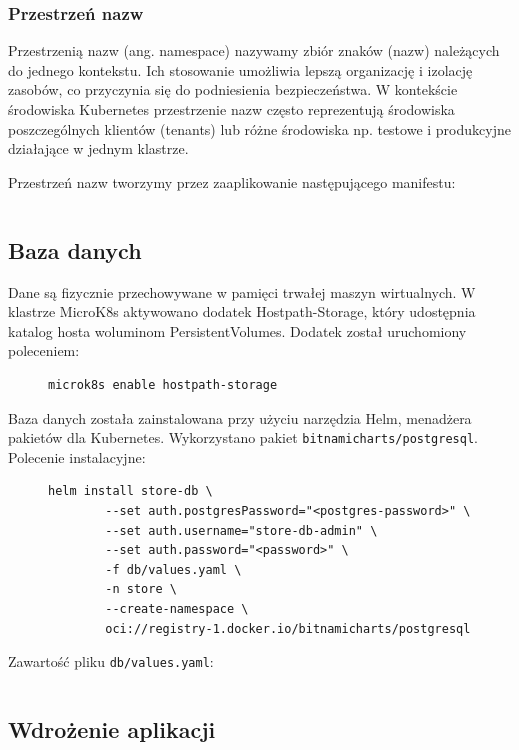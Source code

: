 \subsubsection{Przestrzeń nazw}

Przestrzenią nazw (ang. namespace) nazywamy zbiór znaków (nazw) należących do jednego kontekstu.
Ich stosowanie umożliwia lepszą organizację i izolację zasobów, co przyczynia się do podniesienia bezpieczeństwa.
W kontekście środowiska Kubernetes przestrzenie nazw często reprezentują środowiska poszczególnych klientów (tenants) lub różne środowiska np. testowe i produkcyjne działające w jednym klastrze.

Przestrzeń nazw tworzymy przez zaaplikowanie następującego manifestu:
\begin{figure}[H]
    \inputminted{yaml}{code/store-namespace.yaml}
    \label{fig:store-namespace}
\end{figure}

\subsection{Baza danych}

Dane są fizycznie przechowywane w pamięci trwałej maszyn wirtualnych.
W klastrze MicroK8s aktywowano dodatek Hostpath-Storage, który udostępnia katalog hosta woluminom PersistentVolumes.
Dodatek został uruchomiony poleceniem:
\begin{figure}[H]
    \begin{verbatim}
microk8s enable hostpath-storage
    \end{verbatim}
    \label{fig:enable-hostpath-storage}
\end{figure}

Baza danych została zainstalowana przy użyciu narzędzia Helm, menadżera pakietów dla Kubernetes.
Wykorzystano pakiet \texttt{bitnamicharts/postgresql}. Polecenie instalacyjne:

\begin{figure}[H]
    \begin{verbatim}
helm install store-db \
        --set auth.postgresPassword="<postgres-password>" \
        --set auth.username="store-db-admin" \
        --set auth.password="<password>" \
        -f db/values.yaml \
        -n store \
        --create-namespace \
        oci://registry-1.docker.io/bitnamicharts/postgresql
    \end{verbatim}
    \label{fig:helm-install-store-db}
\end{figure}

Zawartość pliku \texttt{db/values.yaml}:
\begin{figure}[H]
    \inputminted{yaml}{code/db-values.yaml}
    \label{fig:db-values}
\end{figure}

\subsection{Wdrożenie aplikacji}

